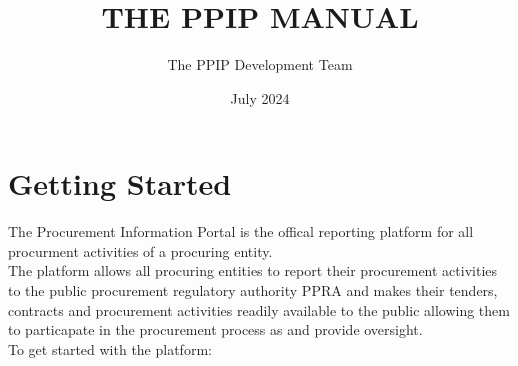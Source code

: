 \documentclass [12pt]{book}
\title{THE PPIP MANUAL}
\author{The PPIP Development Team}
\date{July 2024}
\begin{document}
\maketitle


\chapter{Getting Started}
The Procurement Information Portal is the offical reporting platform for all procurment activities of a procuring entity.\\
The platform allows all procuring entities to report their procurement activities to the public procurement regulatory authority PPRA and makes their tenders, contracts and procurement activities readily available to the public allowing them to particapate in the procurement process as and provide oversight.\\

To get started with the platform:\\
\end{document}
